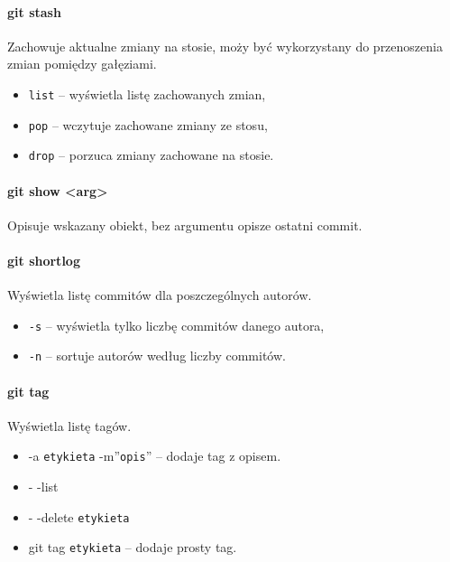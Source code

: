 \paragraph{git stash\\}
Zachowuje aktualne zmiany na stosie, moży być wykorzystany do przenoszenia zmian pomiędzy gałęziami.
\begin{itemize}
	\item \texttt{list} -- wyświetla listę zachowanych zmian,
	\item \texttt{pop} -- wczytuje zachowane zmiany ze stosu,
	\item \texttt{drop} -- porzuca zmiany zachowane na stosie.
\end{itemize}

\paragraph{git show <arg>\\}
Opisuje wskazany obiekt, bez argumentu opisze ostatni commit.

\paragraph{git shortlog\\}
Wyświetla listę commitów dla poszczególnych autorów.
\begin{itemize}
	\item \texttt{-s} -- wyświetla tylko liczbę commitów danego autora,
	\item \texttt{-n} -- sortuje autorów według liczby commitów.
\end{itemize}

\paragraph{git tag\\}
Wyświetla listę tagów.
\begin{itemize}
	\item -a \texttt{etykieta} -m''\texttt{opis}'' -- dodaje tag z opisem.
	\item - -list
	\item  - -delete \texttt{etykieta}
	\item git tag \texttt{etykieta} -- dodaje prosty tag.
\end{itemize}


